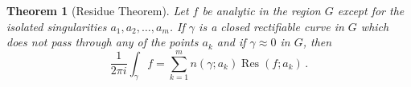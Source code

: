 \documentclass{article}
\newtheorem{theorem}{Theorem}
\DeclareMathOperator{\Res}{Res}
\begin{document}
\pagestyle{empty}
\begin{theorem}[Residue Theorem]
Let $f$ be analytic in the region $G$ except for the isolated 
singularities $a_1,a_2,\dots,a_m$. If $\gamma$ is a closed 
rectifiable curve in $G$ which does not pass through any of the 
points $a_k$ and if $\gamma\approx 0$ in $G$, then
\[
  \frac{1}{2\pi i}\int_\gamma\! f = \sum_{k=1}^m 
  n(\gamma;a_k)\Res(f;a_k)\,.
\]
\end{theorem}
\end{document}
